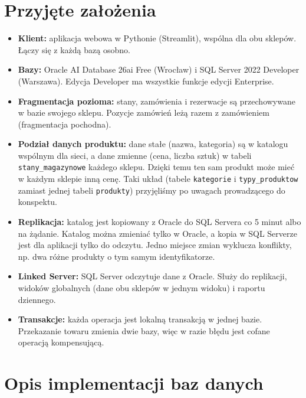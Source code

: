 \documentclass[11pt,a4paper]{article}
\begin{document}
\section{Przyjęte założenia}
\begin{itemize}
  \item \textbf{Klient:} aplikacja webowa w Pythonie (Streamlit), wspólna dla obu
        sklepów. Łączy się z każdą bazą osobno.
  \item \textbf{Bazy:} Oracle AI Database 26ai Free (Wrocław) i SQL Server 2022 Developer
        (Warszawa). Edycja Developer ma wszystkie funkcje edycji Enterprise.
  \item \textbf{Fragmentacja pozioma:} stany, zamówienia i rezerwacje są przechowywane
        w bazie swojego sklepu. Pozycje zamówień leżą razem z zamówieniem
        (fragmentacja pochodna).
  \item \textbf{Podział danych produktu:} dane stałe (nazwa, kategoria) są w katalogu
        wspólnym dla sieci, a dane zmienne (cena, liczba sztuk) w tabeli
        \texttt{stany\_magazynowe} każdego sklepu. Dzięki temu ten sam produkt może mieć
        w każdym sklepie inną cenę. Taki układ (tabele \texttt{kategorie}
        i \texttt{typy\_produktow} zamiast jednej tabeli \texttt{produkty}) przyjęliśmy
        po uwagach prowadzącego do konspektu.
  \item \textbf{Replikacja:} katalog jest kopiowany z Oracle do SQL Servera co 5 minut
        albo na żądanie. Katalog można zmieniać tylko w Oracle, a kopia w SQL Serverze
        jest dla aplikacji tylko do odczytu. Jedno miejsce zmian wyklucza konflikty,
        np. dwa różne produkty o tym samym identyfikatorze.
  \item \textbf{Linked Server:} SQL Server odczytuje dane z Oracle. Służy do replikacji,
        widoków globalnych (dane obu sklepów w jednym widoku) i raportu dziennego.
  \item \textbf{Transakcje:} każda operacja jest lokalną transakcją w jednej bazie.
        Przekazanie towaru zmienia dwie bazy, więc w razie błędu jest cofane
        operacją kompensującą.
\end{itemize}

\section{Opis implementacji baz danych}
\end{document}
